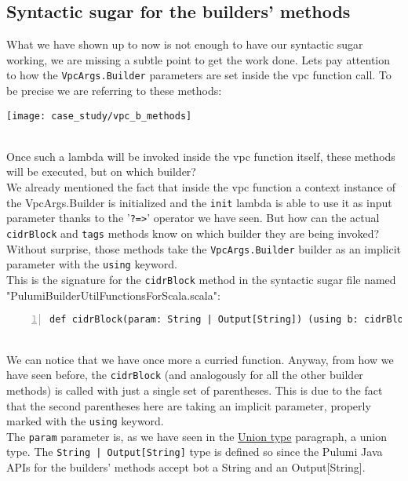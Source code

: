 \subsection{Syntactic sugar for the builders' methods}
\label{ssec:syn-sug-builders}
What we have shown up to now is not enough to have our syntactic sugar working, we are missing a subtle point to get the work done.
Lets pay attention to how the \texttt{VpcArgs.Builder} parameters are set inside the vpc function call.
To be precise we are referring to these methods:
\begin{center}
  \texttt{[image: case\_study/vpc\_b\_methods]} 
\end{center}\mbox{}\\
Once such a lambda will be invoked inside the vpc function itself, these methods will be executed, but on which builder?\\
We already mentioned the fact that inside the vpc function a context instance of the VpcArgs.Builder is initialized and the \texttt{init} lambda is able to use it as input parameter thanks to the '\texttt{?=>}' operator we have seen.
But how can the actual \texttt{cidrBlock} and \texttt{tags} methods know on which builder they are being invoked?\\
Without surprise, those methods take the \texttt{VpcArgs.Builder} builder as an implicit parameter with the \texttt{using} keyword.\\
This is the signature for the \texttt{cidrBlock} method in the syntactic sugar file named "PulumiBuilderUtilFunctionsForScala.scala":
\begin{lstlisting}[numbers=left, numberstyle=\tiny, numbersep=-5pt, stepnumber=1, linewidth=420pt]
  def cidrBlock(param: String | Output[String]) (using b: cidrBlockOwners): Unit
\end{lstlisting}\mbox{}\\
We can notice that we have once more a curried function.
Anyway, from how we have seen before, the \texttt{cidrBlock} (and analogously for all the other builder methods) is called with just a single set of parentheses.
This is due to the fact that the second parentheses here are taking an implicit parameter, properly marked with the \texttt{using} keyword.\\
The \texttt{param} parameter is, as we have seen in the \hyperref[sssec:union]{Union type} paragraph, a union type.
The \texttt{String | Output[String]} type is defined so since the Pulumi Java APIs for the builders' methods accept bot a String and an Output[String].
